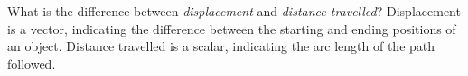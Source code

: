 {What is the difference between \textit{displacement} and \textit{distance travelled}?
}
{
Displacement is a vector, indicating the difference between the starting and ending positions of an object. Distance travelled is a scalar, indicating the arc length of the path followed.
}

